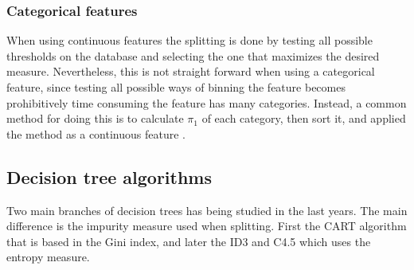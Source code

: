 
 
\subsubsection{Categorical features}
When using continuous features the splitting is done by testing all possible thresholds on the 
database and  selecting the one that maximizes the desired measure. Nevertheless, this is not 
straight forward when using a  categorical feature, since testing all possible ways of binning the 
feature becomes prohibitively time  consuming the feature has many categories. Instead, a common 
method for doing this is to calculate $\pi_1$ of each category, then sort it, and applied the 
method as a continuous feature \citep{Marslan2009}.



\subsection{Decision tree algorithms}
Two main branches of decision trees has being studied in the last years. The main difference is 
the  impurity measure used when splitting. First the CART algorithm that is based in the Gini 
index, and  later the ID3 and C4.5 which uses the entropy measure.

